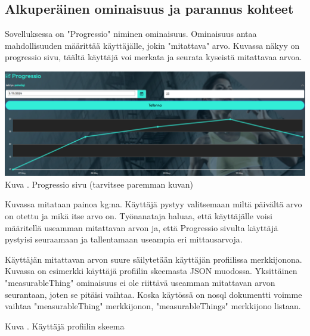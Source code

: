 

\subsection{Alkuperäinen ominaisuus ja parannus kohteet}


Sovelluksessa on "Progressio"{} niminen ominaisuus. 
Ominaisuus antaa mahdollisuuden määrittää käyttäjälle, jokin "mitattava"{} arvo.
Kuvassa \nextImageCount {} näkyy on progressio sivu, täältä käyttäjä voi merkata ja seurata kyseistä mitattavaa arvoa.

\bigskip


\includegraphics[width =15cm]{src/public/progressiosingle.png}\\
Kuva \getImgCount {}. Progressio sivu (tarvitsee paremman kuvan)
\medskip

Kuvassa \theimgCounter {} mitataan painoa kg:na. Käyttäjä pystyy valitsemaan miltä päivältä arvo on otettu ja mikä itse arvo on.
Työnanataja haluaa, että käyttäjälle voisi määritellä useamman mitattavan arvon ja, 
että Progressio sivulta käyttäjä pystyisi seuraamaan ja tallentamaan useampia eri mittausarvoja.
\medskip


Käyttäjän mitattavan arvon suure säilytetään käyttäjän profiilissa merkkijonona. 
Kuvassa \nextImageCount {} on esimerkki käyttäjä profiilin skeemasta JSON muodossa.
Yksittäinen "measurableThing"{} ominaisuus ei ole riittävä useamman mitattavan arvon seurantaan, joten se pitäisi vaihtaa.
Koska käytössä on nosql dokumentti voimme vaihtaa "measurableThing"{} merkkijonon, "measurableThings"{} merkkijono listaan.
\bigskip



Kuva \getImgCount {}. Käyttäjä profiilin skeema
\medskip













